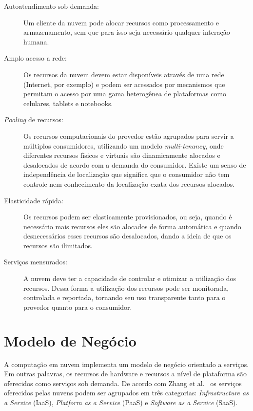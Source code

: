 \begin{description}

	\item[Autoatendimento sob demanda:] Um cliente da nuvem pode alocar recursos como processamento e armazenamento, sem que para isso seja necessário qualquer interação humana.
	
	\item[Amplo acesso a rede:] Os recursos da nuvem devem estar disponíveis através de uma rede (Internet, por exemplo) e podem ser acessados por mecanismos que permitam o acesso por uma gama heterogênea de plataformas como celulares, tablets e notebooks.
	
	\item[\textit{Pooling} de recursos:] Os recursos computacionais do provedor estão agrupados para servir a múltiplos consumidores, utilizando um modelo \textit{multi-tenancy}, onde diferentes recursos físicos e virtuais são dinamicamente alocados e desalocados de acordo com a demanda do consumidor. Existe um senso de independência de localização que significa que o consumidor não tem controle nem conhecimento da localização exata dos recursos alocados.
	
	\item[Elasticidade rápida:] Os recursos podem ser elasticamente provisionados, ou seja, quando é necessário mais recursos eles são alocados de forma automática e quando desnecessários esses recursos são desalocados, dando a ideia de que os recursos são ilimitados.
	
	\item[Serviços mensurados:] A nuvem deve ter a capacidade de controlar e otimizar a utilização dos recursos. Dessa forma a utilização dos recursos pode ser monitorada, controlada e reportada, tornando seu  uso transparente tanto para o provedor quanto para o consumidor.

\end{description} 



\section{Modelo de Negócio} \label{cloud:bus}

A computação em nuvem implementa um modelo de negócio orientado a serviços. Em outras palavras, os recursos de hardware e recursos a nível de plataforma são oferecidos como serviços sob demanda. De acordo com Zhang et al.~\citeyearpar{stateOfArt:2010} os serviços oferecidos pelas nuvens podem ser agrupados em três categorias: \textit{Infrastructure as a Service} (IaaS), \textit{Platform as a Service} (PaaS) e \textit{Software as a Service} (SaaS).

